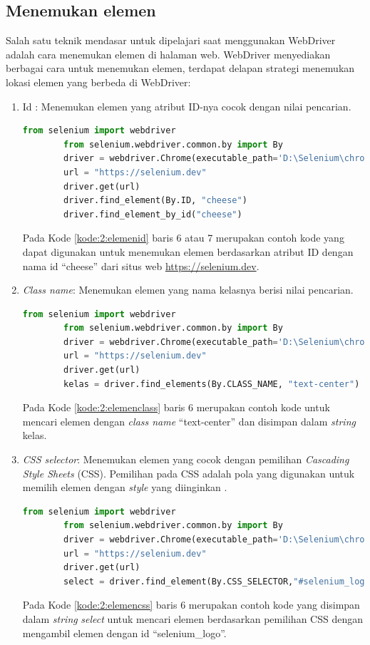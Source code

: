 \subsection{Menemukan elemen}
Salah satu teknik mendasar untuk dipelajari saat menggunakan WebDriver adalah cara menemukan elemen di halaman web. WebDriver menyediakan berbagai cara untuk menemukan elemen, terdapat delapan strategi menemukan lokasi elemen yang berbeda di WebDriver:
\begin{enumerate}
	\item Id : Menemukan elemen yang atribut ID-nya cocok dengan nilai pencarian.
	\begin{lstlisting}[language=python, caption=Contoh kode untuk menemukan elemen dengan atribut ID, label=kode:2:elemenid]
		from selenium import webdriver
		from selenium.webdriver.common.by import By
		driver = webdriver.Chrome(executable_path='D:\Selenium\chromedriver.exe')
		url = "https://selenium.dev"
		driver.get(url)
		driver.find_element(By.ID, "cheese")	
		driver.find_element_by_id("cheese")
	\end{lstlisting}
	Pada Kode \ref{kode:2:elemenid} baris 6 atau 7 merupakan contoh kode yang dapat digunakan untuk menemukan elemen berdasarkan atribut ID dengan nama id ``cheese'' dari situs web \url{https://selenium.dev}. 

	\item \textit{Class name}: Menemukan elemen yang nama kelasnya berisi nilai pencarian.
	\begin{lstlisting}[language=python, caption=Contoh kode untuk menemukan elemen dengan \textit{class name}, label=kode:2:elemenclass]
		from selenium import webdriver
		from selenium.webdriver.common.by import By
		driver = webdriver.Chrome(executable_path='D:\Selenium\chromedriver.exe')
		url = "https://selenium.dev"
		driver.get(url)
		kelas = driver.find_elements(By.CLASS_NAME, "text-center")
	\end{lstlisting}
	Pada Kode \ref{kode:2:elemenclass} baris 6 merupakan contoh kode untuk mencari elemen dengan \textit{class name} ``text-center'' dan disimpan dalam \textit{string} kelas.

	\item \textit{CSS selector}: Menemukan elemen yang cocok dengan pemilihan \textit{Cascading Style Sheets} (CSS). Pemilihan pada CSS adalah pola yang digunakan untuk memilih elemen dengan \textit{style} yang diinginkan .
	\begin{lstlisting}[language=python, caption=Contoh kode untuk menemukan elemen dengan \textit{CSS selector}, label=kode:2:elemencss]
		from selenium import webdriver
		from selenium.webdriver.common.by import By
		driver = webdriver.Chrome(executable_path='D:\Selenium\chromedriver.exe')
		url = "https://selenium.dev"
		driver.get(url)
		select = driver.find_element(By.CSS_SELECTOR,"#selenium_logo")
	\end{lstlisting}
	Pada Kode \ref{kode:2:elemencss} baris 6 merupakan contoh kode yang disimpan dalam \textit{string} \textit{select} untuk mencari elemen berdasarkan pemilihan CSS dengan mengambil elemen dengan id ``selenium\_logo''.\\ \\


\end{enumerate}
